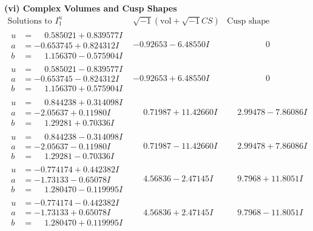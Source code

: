\documentclass[1p]{elsarticle_modified}
\theoremstyle{definition}
\newcommand{\I}{\sqrt{-1}}
\begin{document}
\newpage\flushleft \textbf{(vi) Complex Volumes and Cusp Shapes}
$$\begin{array}{c|c|c}  
\text{Solutions to }I^u_{1}& \I (\text{vol} + \sqrt{-1}CS) & \text{Cusp shape}\\
 \hline 
\begin{aligned}
u &= \phantom{-}0.585021 + 0.839577 I \\
a &= -0.653745 + 0.824312 I \\
b &= \phantom{-}1.156370 - 0.575904 I\end{aligned}
 & -0.92653 - 6.48550 I & \phantom{-0.000000 } 0 \\ \hline\begin{aligned}
u &= \phantom{-}0.585021 - 0.839577 I \\
a &= -0.653745 - 0.824312 I \\
b &= \phantom{-}1.156370 + 0.575904 I\end{aligned}
 & -0.92653 + 6.48550 I & \phantom{-0.000000 } 0 \\ \hline\begin{aligned}
u &= \phantom{-}0.844238 + 0.314098 I \\
a &= -2.05637 + 0.11980 I \\
b &= \phantom{-}1.29281 + 0.70336 I\end{aligned}
 & \phantom{-}0.71987 + 11.42660 I & \phantom{-}2.99478 - 7.86086 I \\ \hline\begin{aligned}
u &= \phantom{-}0.844238 - 0.314098 I \\
a &= -2.05637 - 0.11980 I \\
b &= \phantom{-}1.29281 - 0.70336 I\end{aligned}
 & \phantom{-}0.71987 - 11.42660 I & \phantom{-}2.99478 + 7.86086 I \\ \hline\begin{aligned}
u &= -0.774174 + 0.442382 I \\
a &= -1.73133 - 0.65078 I \\
b &= \phantom{-}1.280470 - 0.119995 I\end{aligned}
 & \phantom{-}4.56836 - 2.47145 I & \phantom{-}9.7968 + 11.8051 I \\ \hline\begin{aligned}
u &= -0.774174 - 0.442382 I \\
a &= -1.73133 + 0.65078 I \\
b &= \phantom{-}1.280470 + 0.119995 I\end{aligned}
 & \phantom{-}4.56836 + 2.47145 I & \phantom{-}9.7968 - 11.8051 I \\ \hline\begin{aligned}

\end{aligned}
\end{array}$$
\end{document}
